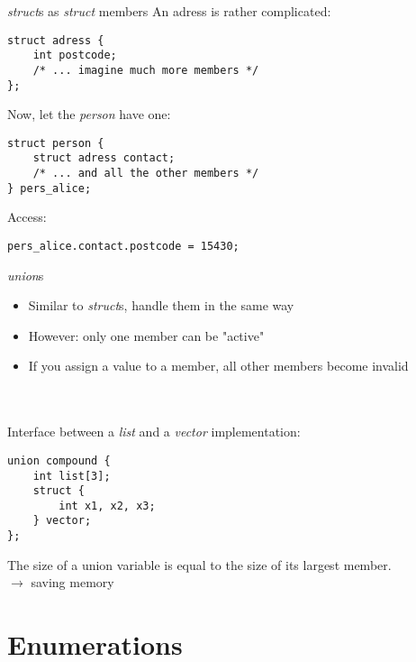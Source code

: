 \begin{frame}[fragile]{\textit{struct}s as \textit{struct} members}
	An adress is rather complicated:
	\begin{lstlisting}[numbers=none]
struct adress {
	int postcode;
	/* ... imagine much more members */
};
\end{lstlisting}
	Now, let the \textit{person} have one:
	\begin{lstlisting}[numbers=none]
struct person {
	struct adress contact;
	/* ... and all the other members */
} pers_alice;
\end{lstlisting}
	Access:
\begin{lstlisting}[numbers=none]
pers_alice.contact.postcode = 15430;
\end{lstlisting}
\end{frame}
\begin{frame}[fragile]{\textit{union}s}
	\begin{itemize}
		\item Similar to \textit{struct}s, handle them in the same way
		\item However: only one member can be "active"
		\item If you assign a value to a member, all other members become invalid
	\end{itemize} \ \\ \ \\
	Interface between a \textit{list} and a \textit{vector} implementation:
	\begin{lstlisting}[numbers=none]
union compound {
	int list[3];
	struct {
		int x1, x2, x3;
	} vector;
};
\end{lstlisting}
	The size of a union variable is equal to the size of its largest member.\\
	$\rightarrow$ saving memory
\end{frame}
\section{Enumerations}
